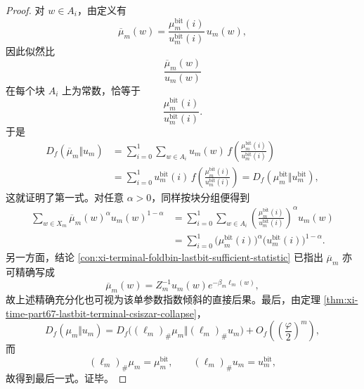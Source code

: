 \begin{proof}
对 \(w\in A_i\)，由定义有
\[
\overline\mu_m(w)
=
\frac{\mu_m^{\mathrm{bit}}(i)}{u_m^{\mathrm{bit}}(i)}\,u_m(w),
\]
因此似然比
\[
\frac{\overline\mu_m(w)}{u_m(w)}
\]
在每个块 \(A_i\) 上为常数，恰等于
\[
\frac{\mu_m^{\mathrm{bit}}(i)}{u_m^{\mathrm{bit}}(i)}.
\]
于是
\[
\begin{aligned}
D_f(\overline\mu_m\Vert u_m)
&=
\sum_{i=0}^{1}\sum_{w\in A_i}
u_m(w)\,
f\!\left(\frac{\mu_m^{\mathrm{bit}}(i)}{u_m^{\mathrm{bit}}(i)}\right)\\
&=
\sum_{i=0}^{1}
u_m^{\mathrm{bit}}(i)\,
f\!\left(\frac{\mu_m^{\mathrm{bit}}(i)}{u_m^{\mathrm{bit}}(i)}\right)
=
D_f(\mu_m^{\mathrm{bit}}\Vert u_m^{\mathrm{bit}}),
\end{aligned}
\]
这就证明了第一式。对任意 \(\alpha>0\)，同样按块分组便得到
\[
\begin{aligned}
\sum_{w\in X_m}\overline\mu_m(w)^\alpha u_m(w)^{1-\alpha}
&=
\sum_{i=0}^{1}\sum_{w\in A_i}
\left(
\frac{\mu_m^{\mathrm{bit}}(i)}{u_m^{\mathrm{bit}}(i)}
\right)^\alpha
u_m(w)\\
&=
\sum_{i=0}^{1}
\bigl(\mu_m^{\mathrm{bit}}(i)\bigr)^\alpha
\bigl(u_m^{\mathrm{bit}}(i)\bigr)^{1-\alpha}.
\end{aligned}
\]
另一方面，结论 \ref{con:xi-terminal-foldbin-lastbit-sufficient-statistic} 已指出 \(\overline\mu_m\) 亦可精确写成
\[
\overline\mu_m(w)=Z_m^{-1}u_m(w)e^{-\beta_m\ell_m(w)},
\]
故上述精确充分化也可视为该单参数指数倾斜的直接后果。最后，由定理 \ref{thm:xi-time-part67-lastbit-terminal-csiszar-collapse}，
\[
D_f(\mu_m\Vert u_m)
=
D_f\!\bigl((\ell_m)_\#\mu_m\Vert(\ell_m)_\#u_m\bigr)
+O_f\!\left(\left(\frac{\varphi}{2}\right)^m\right),
\]
而
\[
(\ell_m)_\#\mu_m=\mu_m^{\mathrm{bit}},
\qquad
(\ell_m)_\#u_m=u_m^{\mathrm{bit}},
\]
故得到最后一式。证毕。
\end{proof}

